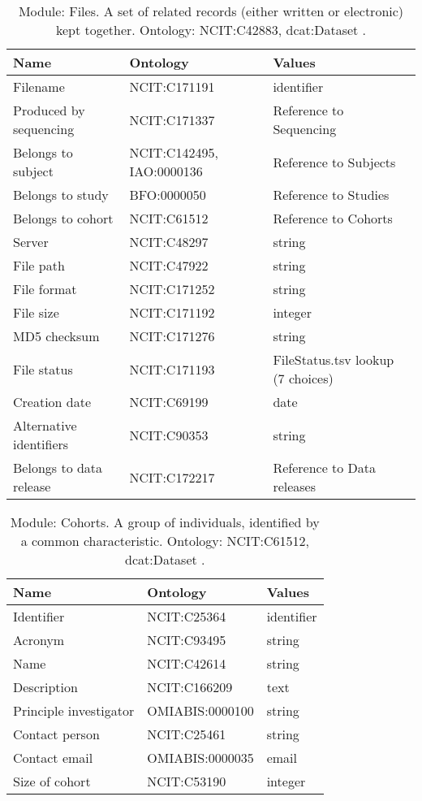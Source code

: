 \documentclass{article}
\begin{document}
\begin{table}[htb]
\begin{tabular}{lll}
Name & Ontology & Values \\
\hline
Filename & NCIT:C171191  & identifier \\
Produced by sequencing & NCIT:C171337  & Reference to Sequencing \\
Belongs to subject & NCIT:C142495, IAO:0000136  & Reference to Subjects \\
Belongs to study & BFO:0000050  & Reference to Studies \\
Belongs to cohort & NCIT:C61512  & Reference to Cohorts \\
Server & NCIT:C48297  & string \\
File path & NCIT:C47922  & string \\
File format & NCIT:C171252  & string \\
File size & NCIT:C171192  & integer \\
MD5 checksum & NCIT:C171276  & string \\
File status & NCIT:C171193  & FileStatus.tsv lookup (7 choices) \\
Creation date & NCIT:C69199  & date \\
Alternative identifiers & NCIT:C90353  & string \\
Belongs to data release & NCIT:C172217  & Reference to Data releases \\
\hline
\end{tabular}
\caption[Module: Files]{\label{table:table11} Module: Files. A set of related records (either written or electronic) kept together. Ontology: NCIT:C42883, dcat:Dataset . }
\end{table}

\begin{table}[htb]
\begin{tabular}{lll}
Name & Ontology & Values \\
\hline
Identifier & NCIT:C25364  & identifier \\
Acronym & NCIT:C93495  & string \\
Name & NCIT:C42614  & string \\
Description & NCIT:C166209  & text \\
Principle investigator & OMIABIS:0000100  & string \\
Contact person & NCIT:C25461  & string \\
Contact email & OMIABIS:0000035  & email \\
Size of cohort & NCIT:C53190  & integer \\
\hline
\end{tabular}
\caption[Module: Cohorts]{\label{table:table12} Module: Cohorts. A group of individuals, identified by a common characteristic. Ontology: NCIT:C61512, dcat:Dataset . }
\end{table}
\end{document}
